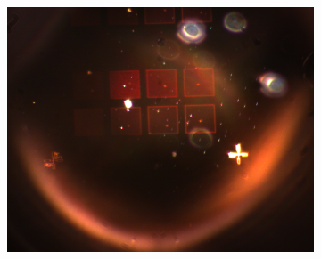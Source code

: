 \begin{figure}[ht]
\begin{subfigure}{0.3\linewidth}
      \caption{}
      \label{fig:subfig2}
    \end{subfigure}
    \begin{subfigure}{0.3\linewidth}
      \includegraphics[width=\linewidth]{data/Gruppe2/image_2.png}
      \caption{}
      \label{fig:subfig3}
    \end{subfigure}


\end{figure}
